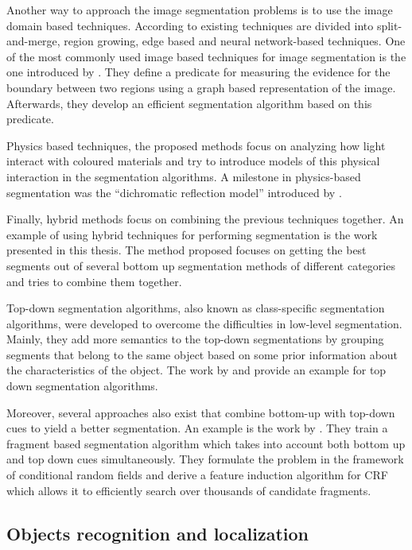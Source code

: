 \documentclass[twoside,11pt]{article}
\begin{document}
Another way to approach the image segmentation problems is to use the image
domain based techniques. According to \cite{Yz_colorimage} existing
techniques
are divided into split-and-merge, region growing, edge based and neural network-based
techniques. One of the most commonly used image based techniques for image
segmentation is the one introduced by \cite{Felzenszwalb04efficientgraph-based}.
They define a predicate for measuring the evidence for the boundary between two
regions using a graph based representation of the image. Afterwards, they
develop an efficient segmentation algorithm based on this predicate.

Physics based techniques, the proposed methods focus on
analyzing how light interact with coloured materials and try to introduce
models of this physical interaction in the segmentation algorithms. A
milestone in physics-based segmentation was the ``dichromatic reflection
model'' introduced by \cite{136817}.

Finally, hybrid methods focus on combining the previous techniques together.
An example of using hybrid techniques for performing segmentation is the work
presented in this thesis. The method proposed focuses on getting the
best segments out of several bottom up segmentation methods of different
categories and tries to combine them together.

Top-down segmentation algorithms, also known as class-specific
segmentation algorithms, were developed to overcome the difficulties in
low-level segmentation. Mainly, they add more semantics to the top-down
segmentations by grouping segments that belong to the same object based
on some prior information about the
characteristics of the object. The work by \cite{649285} and \cite{1097721}
provide an example for top down segmentation algorithms.

Moreover, several approaches also exist that combine bottom-up with top-down cues
to yield a better segmentation. An example is the work by \cite{Levin06learningto}.
They train a fragment based segmentation algorithm which
takes into account both bottom up and top down cues simultaneously. They formulate
the problem in the framework of conditional random fields and derive a feature
induction algorithm for CRF which allows it to efficiently search over thousands
of candidate fragments.

\subsection{Objects recognition and localization}
\end{document}
